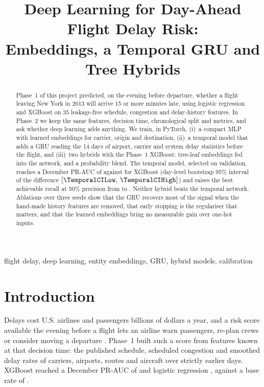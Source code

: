 \documentclass[conference]{IEEEtran}
\begin{document}
\title{Deep Learning for Day-Ahead Flight Delay Risk:\\Embeddings, a Temporal GRU and Tree Hybrids}

\author{
}

\maketitle

\begin{abstract}
Phase~1 of this project predicted, on the evening before departure, whether a flight
leaving New York in 2013 will arrive 15 or more minutes late, using logistic regression
and XGBoost on 35 leakage-free schedule, congestion and delay-history features. In
Phase~2 we keep the same features, decision time, chronological split and metrics, and
ask whether deep learning adds anything. We train, in PyTorch, (i)~a compact MLP with
learned embeddings for carrier, origin and destination, (ii)~a temporal model that adds
a GRU reading the 14 days of airport, carrier and system delay statistics before the
flight, and (iii)~two hybrids with the Phase~1 XGBoost: tree-leaf embeddings fed into
the network, and a probability blend. The temporal model, selected on validation,
reaches a December PR-AUC of \TemporalTestPR{} against \XgboostTestPR{} for XGBoost
(day-level bootstrap 95\% interval of the difference
$[\TemporalCILow,\,\TemporalCIHigh]$) and raises the best achievable recall at 50\%
precision from \XgboostRecallPfifty{} to \TemporalRecallPfifty. Neither hybrid beats
the temporal network. Ablations over three seeds show that the GRU recovers most of the
signal when the hand-made history features are removed, that early stopping is the
regulariser that matters, and that the learned embeddings bring no measurable gain over
one-hot inputs.
\end{abstract}

\begin{IEEEkeywords}
flight delay, deep learning, entity embeddings, GRU, hybrid models, calibration
\end{IEEEkeywords}

\section{Introduction}
Delays cost U.S. airlines and passengers billions of dollars a year, and a risk score
available the evening before a flight lets an airline warn passengers, re-plan crews or
consider moving a departure \cite{sternberg2017review}. Phase~1 built such a score from
features known at that decision time: the published schedule, scheduled congestion and
smoothed delay rates of carriers, airports, routes and aircraft over strictly earlier
days. XGBoost \cite{chen2016xgboost} reached a December PR-AUC of \XgboostTestPR{} and
logistic regression \LrTestPR, against a base rate of \PriorRateTestPR.
\end{document}

